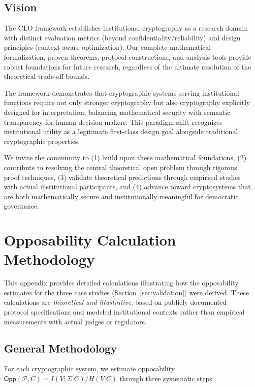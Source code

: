 \documentclass{ieeeaccess}
\begin{document}
\subsection{Vision}

The CLO framework establishes institutional cryptography as a research domain with distinct evaluation metrics (beyond confidentiality/reliability) and design principles (context-aware optimization). Our complete mathematical formalization, proven theorems, protocol constructions, and analysis tools provide robust foundations for future research, regardless of the ultimate resolution of the theoretical trade-off bounds.

The framework demonstrates that cryptographic systems serving institutional functions require not only stronger cryptography but also cryptography explicitly designed for interpretation, balancing mathematical security with semantic transparency for human decision-makers. This paradigm shift recognizes institutional utility as a legitimate first-class design goal alongside traditional cryptographic properties.

We invite the community to (1) build upon these mathematical foundations, (2) contribute to resolving the central theoretical open problem through rigorous proof techniques, (3) validate theoretical predictions through empirical studies with actual institutional participants, and (4) advance toward cryptosystems that are both mathematically secure and institutionally meaningful for democratic governance.


\appendices
\section{Opposability Calculation Methodology}\label{app:opp_calculations}

This appendix provides detailed calculations illustrating how the opposability estimates for the three case studies (Section~\ref{sec:validation}) were derived. These calculations are \emph{theoretical and illustrative}, based on publicly documented protocol specifications and modeled institutional contexts rather than empirical measurements with actual judges or regulators.

\subsection{General Methodology}\label{app:methodology}

For each cryptographic system, we estimate opposability $\mathsf{Opp}(\mathcal{P}, C) = I(V;\Sigma|C)/H(V|C)$ through three systematic steps:
\end{document}
